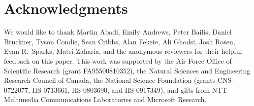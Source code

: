 \section*{Acknowledgments}
We would like to thank Martin Abadi, Emily Andrews, Peter Bailis, Daniel
Bruckner, Tyson Condie, Sean Cribbs, Alan Fekete, Ali Ghodsi, Josh Rosen, Evan
R.\ Sparks, Matei Zaharia, and the anonymous reviewers for their helpful
feedback on this paper.  This work was supported by the Air Force Office of
Scientific Research (grant FA95500810352), the Natural Sciences and Engineering
Research Council of Canada, the National Science Foundation (grants CNS-0722077,
IIS-0713661, IIS-0803690, and IIS-0917349), and gifts from NTT Multimedia
Communications Laboratories and Microsoft Research.
